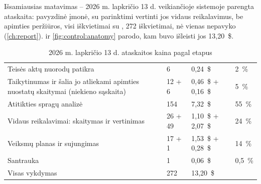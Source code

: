 Išsamiausias matavimas -- 2026 m. lapkričio 13 d. veikiančioje sistemoje parengta ataskaita:
pavyzdinė įmonė, su parinktimi vertinti jos vidaus reikalavimus, be apimties peržiūros, visi
iškvietimai su , 272 iškvietimai, nė vienas nepavyko (\cref{ch:report}).
 ir \cref{fig:control:anatomy} parodo, kam buvo išleisti jos
13,20~\$.

\begin{table}[H]
\caption{2026 m. lapkričio 13 d. ataskaitos kaina pagal etapus}\label{tab:control:anatomy}
\begin{tabularx}{\textwidth}{@{}YR{14mm}R{26mm}R{14mm}@{}}
\toprule
{} &  &  &  \\
\midrule
Teisės aktų nuorodų patikra & 6 & 0,24~\$ & 2~\% \\
Taikytinumas ir šalia jo atliekami apimties nuostatų skaitymai (niekieno sąskaita) & 12 + 6 & 0,46~\$ + 0,16~\$ & 5~\% \\
Atitikties spragų analizė & 154 & 7,32~\$ & 55~\% \\
Vidaus reikalavimai: skaitymas ir vertinimas & 26 + 49 & 1,10~\$ + 2,07~\$ & 24~\% \\
Veiksmų planas ir sujungimas & 17 + 1 & 1,53~\$ + 0,28~\$ & 14~\% \\
Santrauka & 1 & 0,06~\$ & 0,5~\% \\
\midrule
Visas vykdymas & 272 & 13,20~\$ & \\
\bottomrule
\end{tabularx}
\end{table}

